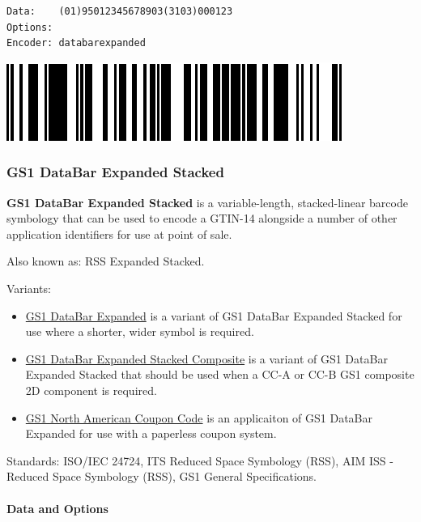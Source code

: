 \begin{verbatim}
Data:    (01)95012345678903(3103)000123
Options: 
Encoder: databarexpanded
\end{verbatim}

\includegraphics{images/databarexpanded-1.eps}

\hypertarget{gs1-databar-expanded-stacked}{%
\subsubsection{GS1 DataBar Expanded
Stacked}\label{gs1-databar-expanded-stacked}}

\textbf{GS1 DataBar Expanded Stacked} is a variable-length,
stacked-linear barcode symbology that can be used to encode a GTIN-14
alongside a number of other application identifiers for use at point of
sale.

Also known as: RSS Expanded Stacked.

Variants:

\begin{itemize}
\tightlist
\item
  \protect\hyperlink{gs1-databar-expanded}{GS1 DataBar Expanded} is a
  variant of GS1 DataBar Expanded Stacked for use where a shorter, wider
  symbol is required.
\item
  \protect\hyperlink{gs1-composite-symbols}{GS1 DataBar Expanded Stacked
  Composite} is a variant of GS1 DataBar Expanded Stacked that should be
  used when a CC-A or CC-B GS1 composite 2D component is required.
\item
  \protect\hyperlink{gs1-north-american-coupon-code}{GS1 North American
  Coupon Code} is an applicaiton of GS1 DataBar Expanded for use with a
  paperless coupon system.
\end{itemize}

Standards: ISO/IEC 24724, ITS Reduced Space Symbology (RSS), AIM ISS -
Reduced Space Symbology (RSS), GS1 General Specifications.

\hypertarget{data-and-options-37}{%
\paragraph{Data and Options}\label{data-and-options-37}}

